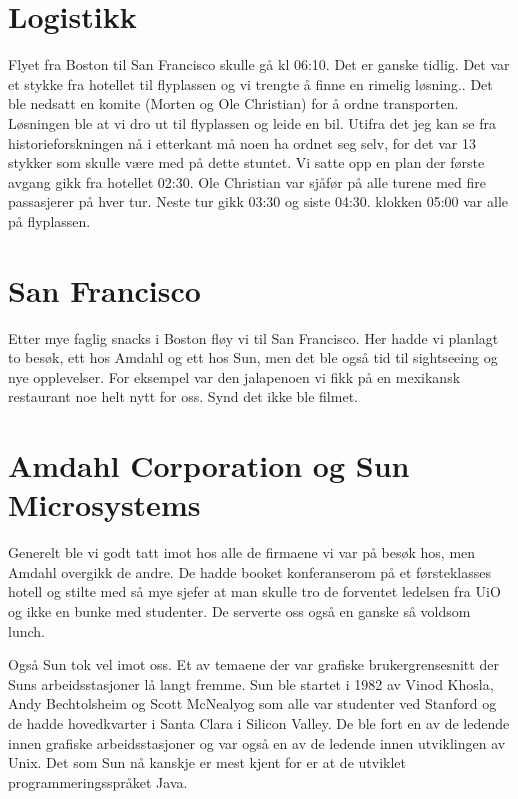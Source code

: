 \documentclass[../../main.tex]{subfiles}
\begin{document}
\section{Logistikk}

Flyet fra Boston til San Francisco skulle gå kl 06:10. Det er ganske tidlig. Det var et stykke fra hotellet til flyplassen og vi trengte å finne en rimelig løsning.. Det ble nedsatt en komite (Morten og Ole Christian) for å ordne transporten. Løsningen ble at vi dro ut til flyplassen og leide en bil. Utifra det jeg kan se fra historieforskningen nå i etterkant må noen ha ordnet seg selv, for det var 13 stykker som skulle være med på dette stuntet. Vi satte opp en plan der første avgang gikk fra hotellet 02:30. Ole Christian var sjåfør på alle turene med fire passasjerer på hver tur. Neste tur gikk 03:30 og siste 04:30. klokken 05:00 var alle på flyplassen.

\section{San Francisco}

Etter mye faglig snacks i Boston fløy vi til San Francisco. Her hadde vi planlagt to besøk, ett hos Amdahl og ett hos Sun, men det ble også tid til sightseeing og nye opplevelser. For eksempel var den jalapenoen vi fikk på en mexikansk restaurant noe helt nytt for oss. Synd det ikke ble filmet. 

\section{Amdahl Corporation og Sun Microsystems}

Generelt ble vi godt tatt imot hos alle de firmaene vi var på besøk hos, men Amdahl overgikk de andre. De hadde booket konferanserom på et førsteklasses hotell og stilte med så mye sjefer at man skulle tro de forventet ledelsen fra UiO og ikke en bunke med studenter. De serverte oss også en ganske så voldsom lunch.

Også Sun tok vel imot oss. Et av temaene der var grafiske brukergrensesnitt der Suns arbeidsstasjoner lå langt fremme. Sun ble startet i 1982 av Vinod Khosla, Andy Bechtolsheim og Scott McNealyog som alle var studenter ved Stanford og de hadde hovedkvarter i Santa Clara i Silicon Valley. De ble fort en av de ledende innen grafiske arbeidsstasjoner og var også en av de ledende innen utviklingen av Unix. Det som Sun nå kanskje er mest kjent for er at de utviklet programmeringsspråket Java.
\end{document}
